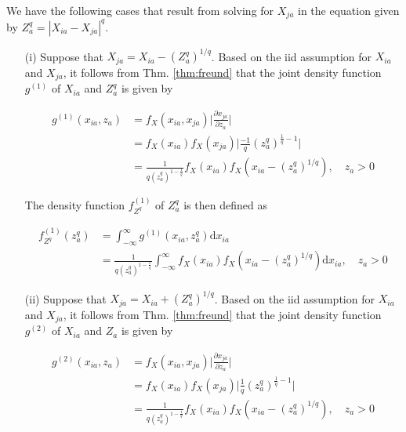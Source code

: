 \documentclass[10pt,letterpaper]{article}\usepackage[]{graphicx}\usepackage[]{color}
\begin{document}
We have the following cases that result from solving for $X_{ja}$ in the equation given by $Z^q_a = |X_{ia} - X_{ja}|^q$.
\begin{itemize}
\item[(i)] Suppose that $X_{ja} = X_{ia} - \left(Z^q_a\right)^{1/q}$. Based on the iid assumption for $X_{ia}$ and $X_{ja}$, it follows from Thm. \ref{thm:freund} that the joint density function $g^{(1)}$ of $X_{ia}$ and $Z^q_a$ is given by

\begin{equation}
\begin{aligned}
g^{(1)}(x_{ia},z_a) &= f_X(x_{ia},x_{ja})\biggl|\frac{\partial x_{ja}}{\partial z_a}\biggr| \\
&= f_X(x_{ia})f_X(x_{ja})\biggl|\frac{-1}{q} \left(z^q_a\right)^{\frac{1}{q}-1}\biggr| \\
&= \frac{1}{q \left(z^q_a\right)^{1 - \frac{1}{q}}}f_X(x_{ia})f_X\left(x_{ia}-\left(z^q_a\right)^{1/q}\right), \quad z_a > 0
\end{aligned}
\end{equation}

The density function $f^{(1)}_{Z^q}$ of $Z^q_a$ is then defined as

\begin{equation}
\begin{aligned}
f^{(1)}_{Z^q}(z^q_a) &= \int_{-\infty}^{\infty} g^{(1)}(x_{ia},z^q_a)\text{d}x_{ia} \\
&= \frac{1}{q \left(z^q_a\right)^{1 - \frac{1}{q}}}\int_{-\infty}^{\infty} f_X(x_{ia})f_X\left(x_{ia}-\left(z^q_a\right)^{1/q}\right)\text{d}x_{ia}, \quad z_a > 0
\end{aligned}
\end{equation}

\item[(ii)] Suppose that $X_{ja} = X_{ia} + \left(Z^q_a\right)^{1/q}$. Based on the iid assumption for $X_{ia}$ and $X_{ja}$, it follows from Thm. \ref{thm:freund} that the joint density function $g^{(2)}$ of $X_{ia}$ and $Z_a$ is given by

\begin{equation}
\begin{aligned}
g^{(2)}(x_{ia},z_a) &= f_X(x_{ia},x_{ja})\biggl|\frac{\partial x_{ja}}{\partial z_a}\biggr| \\
&= f_X(x_{ia})f_X(x_{ja})\biggl|\frac{1}{q} \left(z^q_a\right)^{\frac{1}{q}-1}\biggr| \\
&= \frac{1}{q \left(z^q_a\right)^{1 - \frac{1}{q}}}f_X(x_{ia})f_X\left(x_{ia}-\left(z^q_a\right)^{1/q}\right), \quad z_a > 0
\end{aligned}
\end{equation}


\end{itemize}
\end{document}
